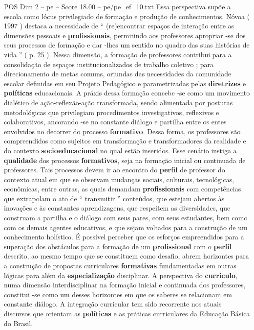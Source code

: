 \begin{textsample}{POS Dim 2 – pe – Score 18.00 – pe/pe\_ef\_10.txt}
Essa perspectiva supõe a escola como lócus privilegiado de formação e produção de conhecimentos.
Nóvoa ( 1997 ) destaca a necessidade de “ (re)encontrar espaços de interação entre as dimensões pessoais e \textbf{profissionais}, permitindo aos professores apropriar -se dos seus processos de formação e dar -lhes um sentido no quadro das suas histórias de vida ” ( p. 25 ).
Nessa dimensão, a formação de professores contribui para a consolidação de espaços institucionalizados de trabalho coletivo ; para direcionamento de metas comuns, oriundas das necessidades da comunidade escolar definidas em seu Projeto Pedagógico e parametrizadas pelas \textbf{diretrizes} e \textbf{políticas} educacionais.
A práxis dessa formação concebe -se como um movimento dialético de ação-reflexão-ação transformada, sendo alimentada por posturas metodológicas que privilegiam procedimentos investigativos, reflexivos e colaborativos, ancorando -se no constante diálogo e partilha entre os entes envolvidos no decorrer do processo \textbf{formativo}.
Dessa forma, os professores são compreendidos como sujeitos em transformação e transformadores da realidade e do contexto \textbf{socioeducacional} no qual estão inseridos.
Esse cenário instiga a \textbf{qualidade} dos processos \textbf{formativos}, seja na formação inicial ou continuada de professores.
Tais processos devem ir ao encontro do \textbf{perfil} de professor do contexto atual em que se observam mudanças sociais, culturais, tecnológicas, econômicas, entre outras, as quais demandam \textbf{profissionais} com competências que extrapolam o ato de “ transmitir ” conteúdos, que estejam abertos às inovações e às constantes aprendizagens, que respeitem as diversidades, que construam a partilha e o diálogo com seus pares, com seus estudantes, bem como com os demais agentes educativos, e que sejam voltados para a construção de um conhecimento holístico.
É possível perceber que os esforços empreendidos para a superação dos obstáculos para a formação de um \textbf{profissional} com o \textbf{perfil} descrito, ao mesmo tempo que se constituem como desafio, abrem horizontes para a construção de propostas curriculares \textbf{formativas} fundamentadas em outras lógicas para além da \textbf{especialização} disciplinar.
A perspectiva do \textbf{currículo}, numa dimensão interdisciplinar na formação inicial e continuada dos professores, constitui -se como um desses horizontes em que os saberes se relacionam em constante diálogo.
A integração curricular tem sido recorrente nos atuais discursos que orientam as \textbf{políticas} e as práticas curriculares da Educação Básica do Brasil.

\end{textsample}
